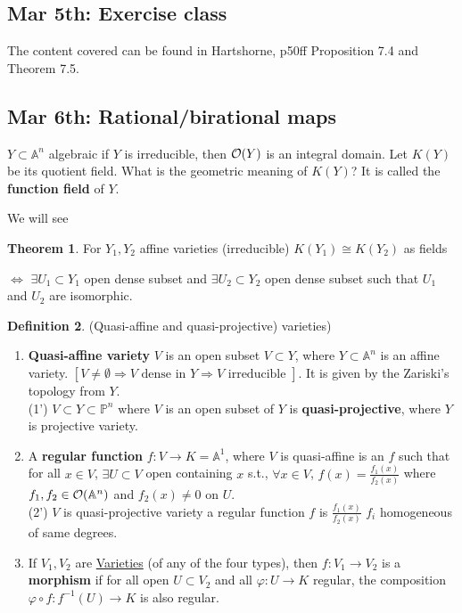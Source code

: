 \documentclass[11pt]{article}
\theoremstyle{definition}
\newtheorem{thm}{Theorem}[section]
\newtheorem{dfn}[thm]{Definition}
\newcommand{\affn}{\mathbb A}
\newcommand{\proj}{\mathbb P}
\newcommand{\calo}{{\cal O}}
\newcommand{\Lrta}{\Longrightarrow}
\newcommand{\lrta}{\longrightarrow}
\newcommand{\Llrta}{\Longleftrightarrow}
\begin{document}
\subsection{Mar 5th: Exercise class}
The content covered can be found in Hartshorne, p50ff Proposition 7.4 and Theorem 7.5.


\subsection{Mar 6th: Rational/birational maps}

$Y\subset \affn^n$ algebraic if $Y$ is irreducible, then $\calo(Y)$ is an integral domain. Let $K(Y)$ be its quotient field. What is the geometric meaning of $K(Y)$? It is called the \textbf{function field} of $Y$.

We will see
\begin{thm}
For $Y_1,Y_2$ affine varieties (irreducible) $K(Y_1)\cong K(Y_2)$ as fields

$\Llrta$ $\exists U_1\subset Y_1$ open dense subset and $\exists U_2\subset Y_2$ open dense subset such that $U_1$ and $U_2$ are isomorphic.
\end{thm}
\begin{dfn}
(Quasi-affine  and quasi-projective) varieties)
\begin{enumerate}%
  \item \textbf{Quasi-affine variety} $V$ is an open subset $V\subset Y$, where $Y\subset \affn^n$ is an affine variety. $[V\neq \emptyset\Lrta V\text{ dense in } Y\Lrta V\text{ irreducible }]$. It is given by the Zariski's topology from $Y$.\\
  (1') $V\subset Y\subset \proj^n$ where $V$ is an open subset of $Y$ is \textbf{quasi-projective}, where $Y$ is projective variety.
  \item A \textbf{regular function} $f:V\lrta K=\affn^1$, where $V$ is quasi-affine is an $f$ such that for all $x\in V$, $\exists U\subset V$ open containing $x$ s.t., $\forall x\in V$, $f(x)=\frac{f_1(x)}{f_2(x)}$ where $f_1,f_2\in\calo(\affn^n)$ and $f_2(x)\neq 0$ on $U$.\\
  (2') $V$ is quasi-projective variety a regular function $f$ is $\frac{f_1(x)}{f_2(x)}$ $f_i$ homogeneous of same degrees.
  \item If $V_1,V_2$ are \underline{Varieties} (of any of the four types), then $f:V_1\lrta V_2$ is a \textbf{morphism} if for all open $U\subset V_2$ and  all $\varphi:U\lrta K$ regular, the composition $\varphi\circ f: f^{-1}(U)\lrta K$ is also regular.
  \end{enumerate}
\end{dfn}
\end{document}

